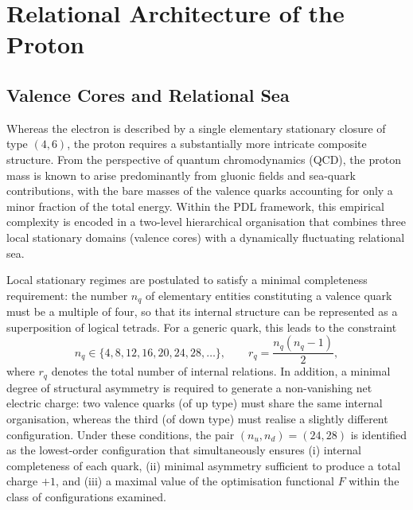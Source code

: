 \documentclass[12pt,a4paper]{article}
\begin{document}
\section{Relational Architecture of the Proton}

\subsection{Valence Cores and Relational Sea}

Whereas the electron is described by a single elementary stationary closure of type \((4,6)\), the proton requires a substantially more intricate composite structure. From the perspective of quantum chromodynamics (QCD), the proton mass is known to arise predominantly from gluonic fields and sea-quark contributions, with the bare masses of the valence quarks accounting for only a minor fraction of the total energy. Within the PDL framework, this empirical complexity is encoded in a two-level hierarchical organisation that combines three local stationary domains (valence cores) with a dynamically fluctuating relational sea.\cite{Laubscher2026PDL_English,Laubscher2026LDP_French}

Local stationary regimes are postulated to satisfy a minimal completeness requirement: the number \(n_q\) of elementary entities constituting a valence quark must be a multiple of four, so that its internal structure can be represented as a superposition of logical tetrads. For a generic quark, this leads to the constraint
\[
  n_q \in \{4,8,12,16,20,24,28,\dots\},
  \qquad
  r_q = \frac{n_q(n_q-1)}{2},
\]
where \(r_q\) denotes the total number of internal relations. In addition, a minimal degree of structural asymmetry is required to generate a non-vanishing net electric charge: two valence quarks (of up type) must share the same internal organisation, whereas the third (of down type) must realise a slightly different configuration. Under these conditions, the pair \((n_u,n_d) = (24,28)\) is identified as the lowest-order configuration that simultaneously ensures (i) internal completeness of each quark, (ii) minimal asymmetry sufficient to produce a total charge \(+1\), and (iii) a maximal value of the optimisation functional \(F\) within the class of configurations examined.\cite{Laubscher2026LDP_French,Laubscher2026PDL_English}
\end{document}
